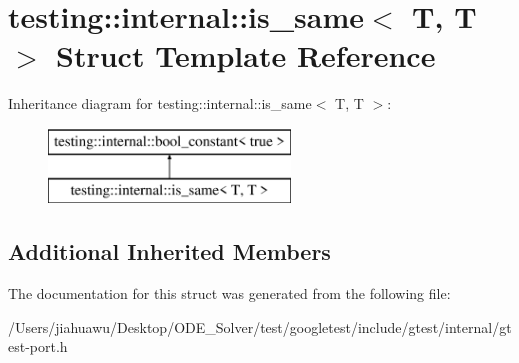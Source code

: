 \hypertarget{structtesting_1_1internal_1_1is__same_3_01_t_00_01_t_01_4}{}\section{testing\+:\+:internal\+:\+:is\+\_\+same$<$ T, T $>$ Struct Template Reference}
\label{structtesting_1_1internal_1_1is__same_3_01_t_00_01_t_01_4}
Inheritance diagram for testing\+:\+:internal\+:\+:is\+\_\+same$<$ T, T $>$\+:\begin{figure}[H]
\begin{center}
\leavevmode
\includegraphics[height=2.000000cm]{structtesting_1_1internal_1_1is__same_3_01_t_00_01_t_01_4}
\end{center}
\end{figure}
\subsection*{Additional Inherited Members}


The documentation for this struct was generated from the following file\+:\begin{DoxyCompactItemize}
\item 
/\+Users/jiahuawu/\+Desktop/\+O\+D\+E\+\_\+\+Solver/test/googletest/include/gtest/internal/gtest-\/port.\+h\end{DoxyCompactItemize}
